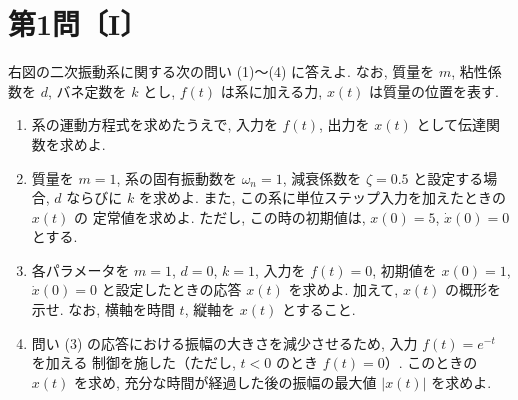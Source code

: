 
\section*{第1問〔I〕}

右図の二次振動系に関する次の問い (1)〜(4) に答えよ. なお, 質量を $m$, 粘性係数を $d$,
バネ定数を $k$ とし, $f(t)$ は系に加える力, $x(t)$ は質量の位置を表す.

\begin{center}
\end{center}

\begin{enumerate}[label=(\arabic*)]
  \item 系の運動方程式を求めたうえで, 入力を $f(t)$, 出力を $x(t)$ として伝達関数を求めよ.

  \item 質量を $m=1$, 系の固有振動数を $\omega_n=1$, 減衰係数を $\zeta=0.5$ と設定する場合,
        $d$ ならびに $k$ を求めよ. また, この系に単位ステップ入力を加えたときの $x(t)$ の
        定常値を求めよ. ただし, この時の初期値は, $x(0)=5$, $\dot{x}(0)=0$ とする.

  \item 各パラメータを $m=1$, $d=0$, $k=1$, 入力を $f(t)=0$, 初期値を $x(0)=1$,
        $\dot{x}(0)=0$ と設定したときの応答 $x(t)$ を求めよ. 加えて, $x(t)$ の概形を示せ.
        なお, 横軸を時間 $t$, 縦軸を $x(t)$ とすること.

  \item 問い (3) の応答における振幅の大きさを減少させるため, 入力 $f(t)=e^{-t}$ を加える
        制御を施した（ただし, $t<0$ のとき $f(t)=0$）. このときの $x(t)$ を求め,
        充分な時間が経過した後の振幅の最大値 $|x(t)|$ を求めよ.
\end{enumerate}
